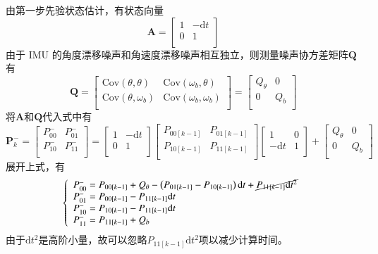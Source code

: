 由第一步先验状态估计，有状态向量
$$
\boldsymbol{A}=\left[ \begin{matrix}
	1&		-\text{d}t\\
	0&		1\\
\end{matrix} \right] 
$$
由于 IMU 的角度漂移噪声和角速度漂移噪声相互独立，则测量噪声协方差矩阵$\boldsymbol{Q}$有
$$
\boldsymbol{Q}=\left[ \begin{matrix}
	\text{Cov}\left( \theta ,\theta \right)&		\text{Cov}\left( \omega _b,\theta \right)\\
	\text{Cov}\left( \theta ,\omega _b \right)&		\text{Cov}\left( \omega _b,\omega _b \right)\\
\end{matrix} \right] =\left[ \begin{matrix}
	Q_{\theta}&		0\\
	0&		Q_b\\
\end{matrix} \right] 
$$
将$\boldsymbol{A}$和$\boldsymbol{Q}$代入式中有
$$
\boldsymbol{P}_{k}^{-}=\left[ \begin{matrix}
	P_{00}^{-}&		P_{01}^{-}\\
	P_{10}^{-}&		P_{11}^{-}\\
\end{matrix} \right] =\left[ \begin{matrix}
	1&		-\text{d}t\\
	0&		1\\
\end{matrix} \right] \left[ \begin{matrix}
	P_{00\left[ k-1 \right]}&		P_{01\left[ k-1 \right]}\\
	P_{10\left[ k-1 \right]}&		P_{11\left[ k-1 \right]}\\
\end{matrix} \right] \left[ \begin{matrix}
	1&		0\\
	-\text{d}t&		1\\
\end{matrix} \right] +\left[ \begin{matrix}
	Q_{\theta}&		0\\
	0&		Q_b\\
\end{matrix} \right] 
$$
展开上式，有
$$
\left\{ \begin{array}{l}
	P_{00}^{-}=P_{00\left[ k-1 \right]}+Q_{\theta}-\left( P_{01\left[ k-1 \right]}-P_{10\left[ k-1 \right]} \right) \text{d}t+\cancel{P_{11\left[ k-1 \right]}\text{d}t^2}\\
	P_{01}^{-}=P_{00\left[ k-1 \right]}-P_{11\left[ k-1 \right]}\text{d}t\\
	P_{10}^{-}=P_{10\left[ k-1 \right]}-P_{11\left[ k-1 \right]}\text{d}t\\
	P_{11}^{-}=P_{11\left[ k-1 \right]}+Q_b\\
\end{array} \right. 
$$
由于$\text{d}t^2$是高阶小量，故可以忽略$P_{11\left[ k-1 \right]}\text{d}t^2$项以减少计算时间。

